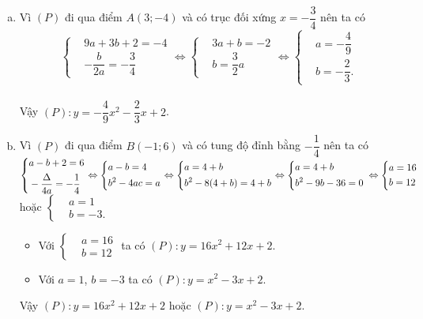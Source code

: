 \begin{baitap}
{\begin{enumerate}[a)]
			\item Vì $(P)$ đi qua điểm $A(3;-4)$ và có trục đối xứng $x=-\dfrac{3}{4}$ nên ta có $$\left\{\begin{aligned}
				&9a+3b+2=-4\\
				&-\dfrac{b}{2a}=-\dfrac{3}{4}
			\end{aligned}\right. \Leftrightarrow \left\{\begin{aligned}
				&3a+b=-2\\
				&b=\dfrac{3}{2}a
			\end{aligned}\right. \Leftrightarrow \left\{\begin{aligned}
				&a=-\dfrac{4}{9}\\
				&b=-\dfrac{2}{3}.
			\end{aligned}\right. $$\\
			Vậy $(P)\colon y=-\dfrac{4}{9}x^2-\dfrac{2}{3}x+2$.
			\item Vì $(P)$ đi qua điểm $B(-1;6)$ và có tung độ đỉnh bằng $-\dfrac{1}{4}$ nên ta có\\
			$\left\{\begin{aligned}
				&a-b+2=6\\
				&-\dfrac{\Delta}{4a}=-\dfrac{1}{4}
			\end{aligned}\right. \Leftrightarrow \left\{\begin{aligned}
				&a-b=4\\
				&b^2-4ac=a
			\end{aligned}\right. \Leftrightarrow \left\{\begin{aligned}
				&a=4+b\\
				&b^2-8(4+b)=4+b
			\end{aligned}\right. \Leftrightarrow \left\{\begin{aligned}
				&a=4+b\\
				&b^2-9b-36=0
			\end{aligned}\right. \\ \Leftrightarrow \left\{\begin{aligned}
				&a=16\\
				&b=12
			\end{aligned}\right. $ hoặc $\left\{\begin{aligned}
				&a=1\\
				&b=-3.
			\end{aligned}\right. $
			\begin{itemize}
				\item Với $\left\{\begin{aligned}
					&a=16\\
					&b=12
				\end{aligned}\right. $ ta có $(P)\colon y=16x^2+12x+2$.
				\item Với $a=1$, $b=-3$ ta có $(P)\colon y=x^2-3x+2$.
			\end{itemize}
			Vậy $(P)\colon y=16x^2+12x+2$ hoặc $(P)\colon y=x^2-3x+2$.
		\end{enumerate}	
	}
\end{baitap}

